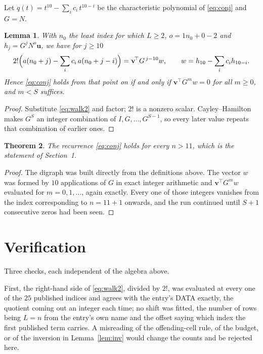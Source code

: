 \documentclass[11pt,a4paper]{article}
\theoremstyle{plain}
\newtheorem{theorem}{Theorem}
\newtheorem{lemma}[theorem]{Lemma}
\theoremstyle{definition}
\begin{document}
Let $q(t)=t^{10}-\sum_i c_i\,t^{10-i}$ be the characteristic polynomial of
\eqref{eq:conj} and $G=N$.

\begin{lemma}\label{lem:crit}
With $n_0$ the least index for which $L\ge2$, $o=1n_0+0-2$ and
$h_j=G^{j}N^{o}\mathbf{u}$, we have for $j\ge10$
\[
2!\Bigl(a(n_0+j)-\sum_i c_i\,a(n_0+j-i)\Bigr)=\mathbf{v}^{\!\top}G^{\,j-10}w,
\qquad w=h_{10}-\sum_i c_i h_{10-i} .
\]
Hence \eqref{eq:conj} holds from that point on if and only if
$\mathbf{v}^{\!\top}G^{m}w=0$ for all $m\ge0$, and $m<S$ suffices.
\end{lemma}

\begin{proof}
Substitute \eqref{eq:walk2} and factor; $2!$ is a nonzero scalar. Cayley--Hamilton
makes $G^{S}$ an integer combination of $I,G,\dots,G^{S-1}$, so every later value repeats
that combination of earlier ones.
\end{proof}

\begin{theorem}
The recurrence \eqref{eq:conj} holds for every $n>11$, which is the statement of
Section~1.
\end{theorem}

\begin{proof}
The digraph was built directly from the definitions above. The vector $w$ was formed by
$10$ applications of $G$ in exact integer arithmetic and $\mathbf{v}^{\!\top}G^{m}w$
evaluated for $m=0,1,\dots$, again exactly. Every one of those integers vanishes from the
index corresponding to $n=11+1$ onwards, and the run continued until $S+1$ consecutive
zeros had been seen.
\end{proof}

\section{Verification}

Three checks, each independent of the algebra above.

First, the right-hand side of \eqref{eq:walk2}, divided by $2!$, was evaluated at every
one of the $25$ published indices and agrees with the entry's DATA exactly, the quotient
coming out an integer each time; no shift was fitted, the number of rows being
$L=n$ from the entry's own name and the offset saying which index the first published
term carries. A misreading of the offending-cell rule, of the budget, or of the inversion in
Lemma~\ref{lem:inv} would change the counts and be rejected here.
\end{document}
